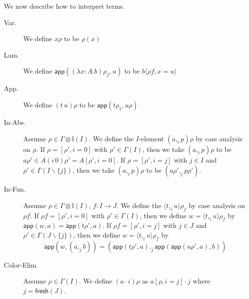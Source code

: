 \documentclass[english]{PaperTools/latex/lipics}
\newcommand\param[1]{\!\cdot\!#1}
\newcommand\fp[3]{⟨#2 ,_{#1} #3⟩}
\def\fresh#1{\mathsf{fresh}(#1)}
\def\app#1#2{\mathsf{app}(#1,#2)}
\begin{document}
\bigskip
We now describe how to interpret terms.
\begin{description}
  \item[\sc Var.]
    We define $xρ$ to be $ρ(x)$

  \item[\sc Lam.]
    We define $\app{(λ x:A.b)ρ_f}{u}$ to be $b⟨ρf,x=u⟩$

  \item[\sc App.]
    We define $(t\,u)ρ$ to be $\app{tρ_1}{uρ}$

  \item[\sc In-Abs.]
    Assume $ρ ∈ Γ⊗𝕀(I)$.  We define the $I$-element $(a ,_i p)ρ$ by case
    analysis on $ρ$.
    If $ρ = [ρ',i=0]$ with $ρ' ∈ Γ(I)$, then we take $(a ,_i p)ρ$ to be
    $aρ' ∈ A(i\,0)ρ' = A[ρ',i=0]$.
    If $ρ = [ρ',i=j]$ with $j ∈ I$ and $ρ' ∈ Γ(I\backslash\{j\})$, then
    we take $(a ,_i p)ρ$ to be
    $(aρ' ,_j pρ')$.

  \item[\sc In-Fun.]
    Assume $ρ ∈ Γ⊗𝕀(I)$, $f : I → J$.  We define the ${\fp i t u}ρ_f$ by
    case analysis on $ρf$.
    If $ρf = [ρ',i=0]$ with $ρ' ∈ Γ(I)$, then we define $w = {\fp i t u}ρ_f$ by
    $\app{w}{a} = \app{tρ'}{a}$.
    If $ρf = [ρ',i=j]$ with $j ∈ J$ and $ρ' ∈ Γ(J\backslash\{j\})$, then
    we define $w = {\fp i t u}ρ_f$ by
    $$\app{w}{(a ,_j b)} = ( \app{tρ'}{a} ,_j {\app{\app{uρ'}{a}}{b}} )$$

  \item[\sc Color-Elim.]
    Assume $ρ ∈ Γ(I)$.  We define $(a \param i)ρ$ as
    $a[ρ,i=j]·j$ where $j = \fresh{J}$.
\end{description}
\end{document}
